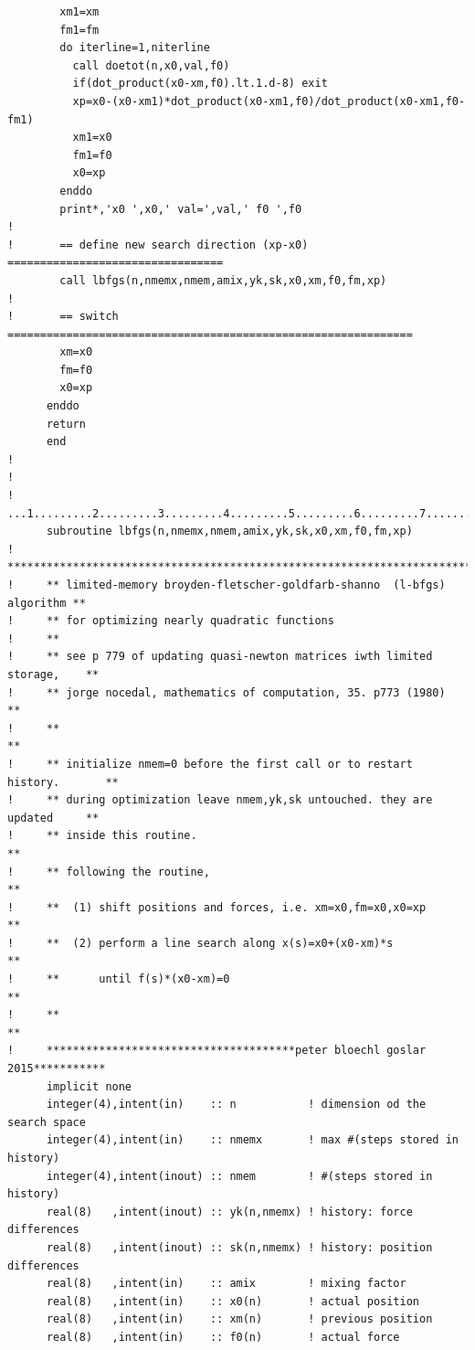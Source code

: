 \documentclass[11pt,a4paper]{report}
\begin{document}
{\begin{verbatim}
        xm1=xm
        fm1=fm
        do iterline=1,niterline
          call doetot(n,x0,val,f0)
          if(dot_product(x0-xm,f0).lt.1.d-8) exit          
          xp=x0-(x0-xm1)*dot_product(x0-xm1,f0)/dot_product(x0-xm1,f0-fm1)
          xm1=x0
          fm1=f0
          x0=xp
        enddo
        print*,'x0 ',x0,' val=',val,' f0 ',f0
!
!       == define new search direction (xp-x0) =================================
        call lbfgs(n,nmemx,nmem,amix,yk,sk,x0,xm,f0,fm,xp)
!
!       == switch ==============================================================
        xm=x0
        fm=f0
        x0=xp
      enddo
      return
      end
!
!
!     ...1.........2.........3.........4.........5.........6.........7.........8
      subroutine lbfgs(n,nmemx,nmem,amix,yk,sk,x0,xm,f0,fm,xp)
!     **************************************************************************
!     ** limited-memory broyden-fletscher-goldfarb-shanno  (l-bfgs) algorithm **
!     ** for optimizing nearly quadratic functions
!     ** 
!     ** see p 779 of updating quasi-newton matrices iwth limited storage,    **
!     ** jorge nocedal, mathematics of computation, 35. p773 (1980)           **
!     **                                                                      **
!     ** initialize nmem=0 before the first call or to restart history.       **
!     ** during optimization leave nmem,yk,sk untouched. they are updated     **
!     ** inside this routine.                                                 **
!     ** following the routine,                                               **
!     **  (1) shift positions and forces, i.e. xm=x0,fm=x0,x0=xp              **
!     **  (2) perform a line search along x(s)=x0+(x0-xm)*s                   **
!     **      until f(s)*(x0-xm)=0                                            **
!     **                                                                      **
!     **************************************peter bloechl goslar 2015***********
      implicit none
      integer(4),intent(in)    :: n           ! dimension od the search space
      integer(4),intent(in)    :: nmemx       ! max #(steps stored in history)
      integer(4),intent(inout) :: nmem        ! #(steps stored in history)
      real(8)   ,intent(inout) :: yk(n,nmemx) ! history: force differences
      real(8)   ,intent(inout) :: sk(n,nmemx) ! history: position differences
      real(8)   ,intent(in)    :: amix        ! mixing factor
      real(8)   ,intent(in)    :: x0(n)       ! actual position
      real(8)   ,intent(in)    :: xm(n)       ! previous position
      real(8)   ,intent(in)    :: f0(n)       ! actual force

\end{verbatim}}
\end{document}
